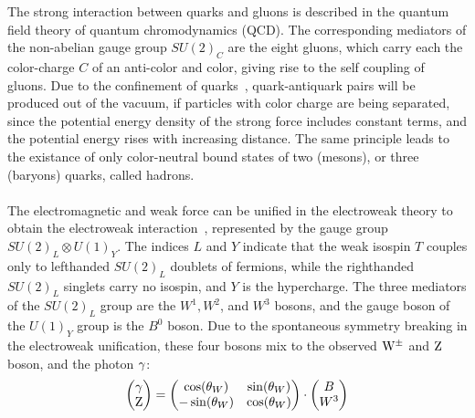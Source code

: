 The strong interaction between quarks and gluons is described in the quantum field theory of quantum chromodynamics (QCD). The corresponding mediators of the non-abelian gauge group $SU(2)_C$ are the eight gluons, which carry each the color-charge $C$ of an anti-color and color, giving rise to the self coupling of gluons. Due to the confinement of quarks~\cite{Confinement}, quark-antiquark pairs will be produced out of the vacuum, if particles with color charge are being separated, since the potential energy density of the strong force includes constant terms, and the potential energy rises with increasing distance. The same principle leads to the existance of only color-neutral bound states of two (mesons), or three (baryons) quarks, called hadrons.
\\\\
The electromagnetic and weak force can be unified in the electroweak theory to obtain the electroweak interaction~\cite{Weinberg,Weinberg2,Salam,Glashow}, represented by the gauge group $ SU(2)_L\otimes U(1)_Y$. The indices $L$ and $Y$ indicate that the weak isospin $T$ couples only to lefthanded $SU(2)_L$ doublets of fermions, while the righthanded $SU(2)_L$ singlets carry no isospin, and $Y$ is the hypercharge. The three mediators of the $SU(2)_L$ group are the $W^1,W^2$, and $W^3$ bosons, and the gauge boson of the $U(1)_Y$ group is the $B^0$ boson.
Due to the spontaneous symmetry breaking in the electroweak unification, these four bosons mix to the observed $\mathrm{W}^\pm$ and $\mathrm{Z}$ boson, and the photon $\gamma$:
\begin{equation}
  \left(
  \begin{matrix}
    \gamma \\
    \mathrm{Z}
  \end{matrix}
  \right)
  =
  \left(\begin{matrix}
  \cos(\theta_W) & \sin(\theta_W)\\
  -\sin(\theta_W) & \cos(\theta_W)
\end{matrix}\right)
\cdot
\left(
\begin{matrix}
  B \\
  W^3
\end{matrix}
\right)
\end{equation}

